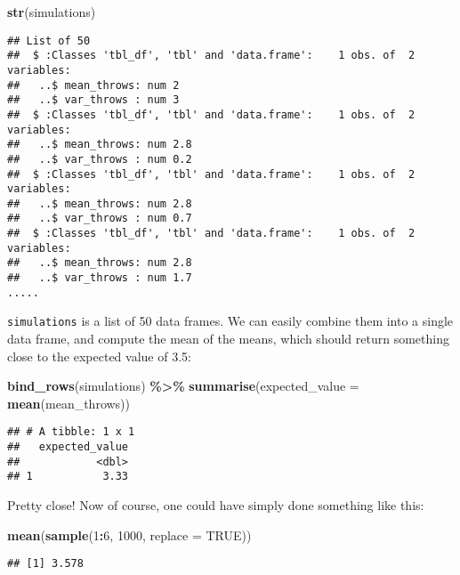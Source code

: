 \documentclass[
]{article}
\newenvironment{Shaded}{\begin{snugshade}}{\end{snugshade}}
\newcommand{\DataTypeTok}[1]{\textcolor[rgb]{0.13,0.29,0.53}{#1}}
\newcommand{\DecValTok}[1]{\textcolor[rgb]{0.00,0.00,0.81}{#1}}
\newcommand{\KeywordTok}[1]{\textcolor[rgb]{0.13,0.29,0.53}{\textbf{#1}}}
\newcommand{\NormalTok}[1]{#1}
\newcommand{\OperatorTok}[1]{\textcolor[rgb]{0.81,0.36,0.00}{\textbf{#1}}}
\newcommand{\OtherTok}[1]{\textcolor[rgb]{0.56,0.35,0.01}{#1}}
\newcommand{\StringTok}[1]{\textcolor[rgb]{0.31,0.60,0.02}{#1}}
\begin{document}
\begin{Shaded}
\begin{Highlighting}[]
\KeywordTok{str}\NormalTok{(simulations)}
\end{Highlighting}
\end{Shaded}

\begin{verbatim}
## List of 50
##  $ :Classes 'tbl_df', 'tbl' and 'data.frame':    1 obs. of  2 variables:
##   ..$ mean_throws: num 2
##   ..$ var_throws : num 3
##  $ :Classes 'tbl_df', 'tbl' and 'data.frame':    1 obs. of  2 variables:
##   ..$ mean_throws: num 2.8
##   ..$ var_throws : num 0.2
##  $ :Classes 'tbl_df', 'tbl' and 'data.frame':    1 obs. of  2 variables:
##   ..$ mean_throws: num 2.8
##   ..$ var_throws : num 0.7
##  $ :Classes 'tbl_df', 'tbl' and 'data.frame':    1 obs. of  2 variables:
##   ..$ mean_throws: num 2.8
##   ..$ var_throws : num 1.7
.....
\end{verbatim}

\texttt{simulations} is a list of 50 data frames. We can easily combine them into a single data frame, and compute the
mean of the means, which should return something close to the expected value of 3.5:

\begin{Shaded}
\begin{Highlighting}[]
\KeywordTok{bind\_rows}\NormalTok{(simulations) }\OperatorTok{\%\textgreater{}\%}
\StringTok{  }\KeywordTok{summarise}\NormalTok{(}\DataTypeTok{expected\_value =} \KeywordTok{mean}\NormalTok{(mean\_throws))}
\end{Highlighting}
\end{Shaded}

\begin{verbatim}
## # A tibble: 1 x 1
##   expected_value
##            <dbl>
## 1           3.33
\end{verbatim}

Pretty close! Now of course, one could have simply done something like this:

\begin{Shaded}
\begin{Highlighting}[]
\KeywordTok{mean}\NormalTok{(}\KeywordTok{sample}\NormalTok{(}\DecValTok{1}\OperatorTok{:}\DecValTok{6}\NormalTok{, }\DecValTok{1000}\NormalTok{, }\DataTypeTok{replace =} \OtherTok{TRUE}\NormalTok{))}
\end{Highlighting}
\end{Shaded}

\begin{verbatim}
## [1] 3.578
\end{verbatim}
\end{document}
